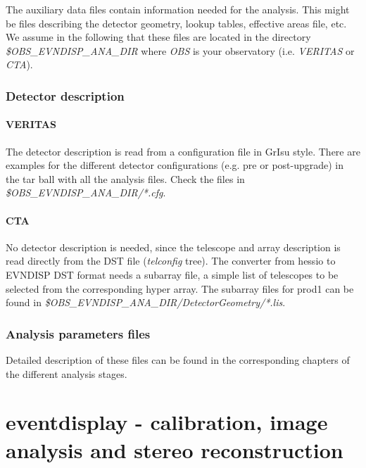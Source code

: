 \documentclass[titlepage,a4paper,twoside,11pt]{report}
\begin{document}
The auxiliary data files contain information needed for the analysis. 
This might be files describing the detector geometry, lookup tables, effective areas file, etc.
We assume in the following that these files are located in the
directory {\it \$OBS\_EVNDISP\_ANA\_DIR} where {\it OBS} is your
observatory (i.e. {\it VERITAS} or {\it CTA}).

\subsection{Detector description}

\subsubsection{VERITAS}

The detector description is read from a configuration file in GrIsu style. There are examples for the different detector configurations (e.g. pre or post-upgrade) in 
the tar ball with all the analysis files. 
Check the files in  {\it \$OBS\_EVNDISP\_ANA\_DIR/*.cfg}.

\subsubsection{CTA}

No detector description is needed, since the telescope and array description is read directly from the DST file ({\it telconfig} tree).
The converter from hessio to EVNDISP DST format needs a subarray file, a simple list of telescopes to be selected from the corresponding hyper array. 
The subarray files for prod1 can be found in {\it \$OBS\_EVNDISP\_ANA\_DIR/DetectorGeometry/*.lis}.

\subsection{Analysis parameters files}

Detailed description of these files can be found in the corresponding chapters of the different analysis stages.

%
%

\chapter{eventdisplay - calibration, image analysis and stereo reconstruction}
\end{document}
